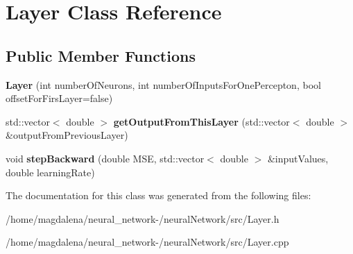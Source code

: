 \hypertarget{classLayer}{}\section{Layer Class Reference}
\label{classLayer}
\subsection*{Public Member Functions}
\begin{DoxyCompactItemize}
\item 
\mbox{\label{classLayer_a6cc1a7bfe1df555cfe2cf39fc5dae343}} 
{\bfseries Layer} (int number\+Of\+Neurons, int number\+Of\+Inputs\+For\+One\+Percepton, bool offset\+For\+Firs\+Layer=false)
\item 
\mbox{\label{classLayer_aac5b6143271ba7eac1bbfdf73ee5836a}} 
std\+::vector$<$ double $>$ {\bfseries get\+Output\+From\+This\+Layer} (std\+::vector$<$ double $>$ \&output\+From\+Previous\+Layer)
\item 
\mbox{\label{classLayer_ab2f29f66dd9d8364a2fc5ece4dd71536}} 
void {\bfseries step\+Backward} (double M\+SE, std\+::vector$<$ double $>$ \&input\+Values, double learning\+Rate)
\end{DoxyCompactItemize}


The documentation for this class was generated from the following files\+:\begin{DoxyCompactItemize}
\item 
/home/magdalena/neural\+\_\+network-\//neural\+Network/src/Layer.\+h\item 
/home/magdalena/neural\+\_\+network-\//neural\+Network/src/Layer.\+cpp\end{DoxyCompactItemize}
